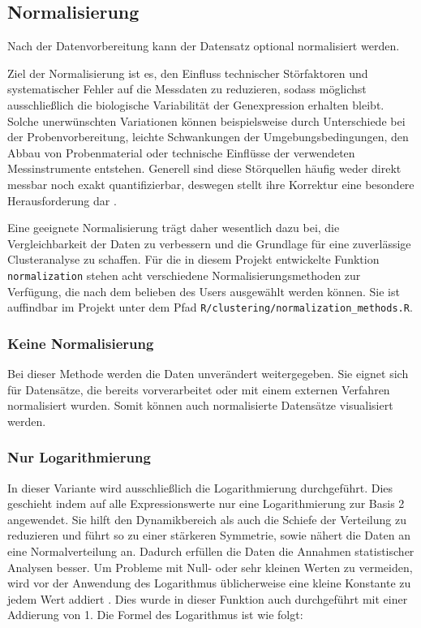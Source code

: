 \documentclass[12pt]{article}
\begin{document}
\subsection{Normalisierung}
\label{normalisierung}

Nach der Datenvorbereitung kann der Datensatz optional normalisiert werden. 

Ziel der Normalisierung ist es, den Einfluss technischer Störfaktoren und systematischer Fehler auf die Messdaten zu reduzieren, sodass möglichst ausschließlich die biologische Variabilität der Genexpression erhalten bleibt. Solche unerwünschten Variationen können beispielsweise durch Unterschiede bei der Probenvorbereitung, leichte Schwankungen der Umgebungsbedingungen, den Abbau von Probenmaterial oder technische Einflüsse der verwendeten Messinstrumente entstehen. Generell sind diese Störquellen häufig weder direkt messbar noch exakt quantifizierbar, deswegen stellt ihre Korrektur eine besondere Herausforderung dar \cite{DUBOIS2022104661}. 

Eine geeignete Normalisierung trägt daher wesentlich dazu bei, die Vergleichbarkeit der Daten zu verbessern und die Grundlage für eine zuverlässige Clusteranalyse zu schaffen. Für die in diesem Projekt entwickelte Funktion \texttt{normalization} stehen acht verschiedene Normalisierungsmethoden zur Verfügung, die nach dem belieben des Users ausgewählt werden können. Sie ist auffindbar im Projekt unter dem Pfad \texttt{R/clustering/normalization\_methods.R}. 


\subsubsection{Keine Normalisierung}
\label{Keine Normalisierung}

Bei dieser Methode werden die Daten unverändert weitergegeben. Sie eignet sich für Datensätze, die bereits vorverarbeitet oder mit einem externen Verfahren normalisiert wurden. Somit können auch normalisierte Datensätze visualisiert werden.


\subsubsection{Nur Logarithmierung}
\label{Nur Logarithmierung}

In dieser Variante wird ausschließlich die Logarithmierung durchgeführt.
Dies geschieht indem auf alle Expressionswerte nur eine Logarithmierung zur Basis 2 angewendet. Sie hilft den Dynamikbereich als auch die Schiefe der Verteilung zu reduzieren und führt so zu einer stärkeren Symmetrie, sowie nähert die Daten an eine Normalverteilung an. Dadurch erfüllen die Daten die Annahmen statistischer Analysen besser. Um Probleme mit Null- oder sehr kleinen Werten zu vermeiden, wird vor der Anwendung des Logarithmus üblicherweise eine kleine Konstante zu jedem Wert addiert \cite{Deng2025}. Dies wurde in dieser Funktion auch durchgeführt mit einer Addierung von 1. Die Formel des Logarithmus ist wie folgt:
\end{document}
